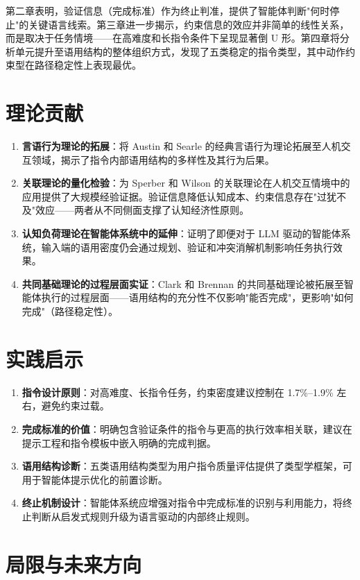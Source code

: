 \documentclass[12pt,a4paper,openany,oneside]{ctexrep}
\begin{document}
第二章表明，验证信息（完成标准）作为终止判准，提供了智能体判断"何时停止"的关键语言线索。第三章进一步揭示，约束信息的效应并非简单的线性关系，而是取决于任务情境——在高难度和长指令条件下呈现显著倒 U 形。第四章将分析单元提升至语用结构的整体组织方式，发现了五类稳定的指令类型，其中动作约束型在路径稳定性上表现最优。

\section{理论贡献}


\begin{enumerate}
\item[1.] \textbf{言语行为理论的拓展}：将 Austin 和 Searle 的经典言语行为理论拓展至人机交互领域，揭示了指令内部语用结构的多样性及其行为后果。
\item[2.] \textbf{关联理论的量化检验}：为 Sperber 和 Wilson 的关联理论在人机交互情境中的应用提供了大规模经验证据。验证信息降低认知成本、约束信息存在"过犹不及"效应——两者从不同侧面支撑了认知经济性原则。
\item[3.] \textbf{认知负荷理论在智能体系统中的延伸}：证明了即便对于 LLM 驱动的智能体系统，输入端的语用密度仍会通过规划、验证和冲突消解机制影响任务执行效果。
\item[4.] \textbf{共同基础理论的过程层面实证}：Clark 和 Brennan 的共同基础理论被拓展至智能体执行的过程层面——语用结构的充分性不仅影响"能否完成"，更影响"如何完成"（路径稳定性）。
\end{enumerate}


\section{实践启示}


\begin{enumerate}
\item[1.] \textbf{指令设计原则}：对高难度、长指令任务，约束密度建议控制在 1.7\%–1.9\% 左右，避免约束过载。
\item[2.] \textbf{完成标准的价值}：明确包含验证条件的指令与更高的执行效率相关联，建议在提示工程和指令模板中嵌入明确的完成判据。
\item[3.] \textbf{语用结构诊断}：五类语用结构类型为用户指令质量评估提供了类型学框架，可用于智能体提示优化的前置诊断。
\item[4.] \textbf{终止机制设计}：智能体系统应增强对指令中完成标准的识别与利用能力，将终止判断从启发式规则升级为语言驱动的内部终止规则。
\end{enumerate}


\section{局限与未来方向}
\end{document}
